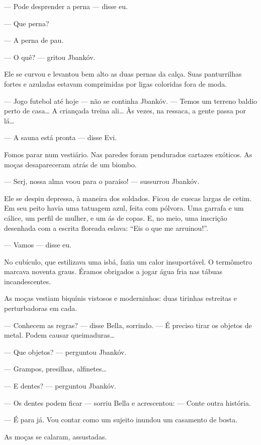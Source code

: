 --- Pode desprender a perna --- disse eu.

--- Que perna?

--- A perna de pau.

--- O quê? --- gritou Jbankóv.

Ele se curvou e levantou bem alto as duas pernas da calça. Suas
panturrilhas fortes e azuladas estavam comprimidas por ligas coloridas
fora de moda.

--- Jogo futebol até hoje --- não se continha Jbankóv.
--- Temos um terreno baldio perto de casa\ldots{} A criançada treina
ali\ldots{} Às vezes, na ressaca, a gente passa por lá\ldots{}

--- A sauna está pronta --- disse Evi.

Fomos parar num vestiário. Nas paredes foram pendurados cartazes
exóticos. As moças desapareceram atrás de um biombo.

--- Serj, nossa alma voou para o paraíso! --- sussurrou
Jbankóv.

Ele se despiu depressa, à maneira dos soldados. Ficou de cuecas largas
de cetim. Em seu peito havia uma tatuagem azul, feita com pólvora. Uma
garrafa e um cálice, um perfil de mulher, e um ás de copas. E, no meio,
uma inscrição desenhada com a escrita floreada eslava: ``Eis o que me
arruinou!''.

--- Vamos --- disse eu.

No cubículo, que estilizava uma isbá, fazia um calor insuportável. O
termômetro marcava noventa graus. Éramos obrigados a jogar água fria nas
tábuas incandescentes.

As moças vestiam biquínis vistosos e moderninhos: duas tirinhas
estreitas e perturbadoras em cada.

--- Conhecem as regras? --- disse Bella, sorrindo.
--- É preciso tirar os objetos de metal. Podem causar
queimaduras\ldots{}

--- Que objetos? --- perguntou Jbankóv.

--- Grampos, presilhas, alfinetes\ldots{}

--- E dentes? --- perguntou Jbankóv.

--- Os dentes podem ficar --- sorriu Bella e acrescentou:
--- Conte outra história.

--- É para já. Vou contar como um sujeito inundou um casamento de
bosta.

As moças se calaram, assustadas.

